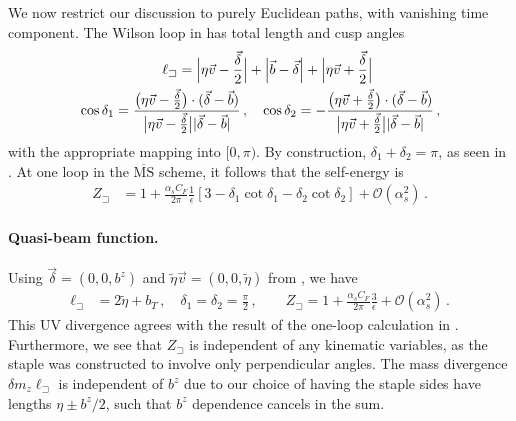 \documentclass[11pt,a4paper]{article}
\newcommand{\MSbar}{{\overline{\mathrm{MS}}}}
\newcommand{\eps}{\epsilon}
\newcommand{\cO}{\mathcal{O}}
\newcommand{\as}{\alpha_s}
\newcommand{\staple}{\sqsupset}
\begin{document}
We now restrict our discussion to purely Euclidean paths, with vanishing time component.
The Wilson loop in  has total length and cusp angles
\begin{align} \label{eq:length}
 &\qquad\qquad\qquad\ell_\staple
 = \Bigl|\eta \vec v - \frac{\vec\delta}{2} \Bigr| + \Bigl| \vec b - \vec \delta \Bigr| + \Bigl|\eta \vec v + \frac{\vec \delta}{2} \Bigr|
\nonumber  \\
& \cos\delta_1
 = \frac{\bigl(\eta \vec v - \tfrac{\vec\delta}{2}\bigr) \cdot (\vec\delta - \vec b)}
        {\bigl|\eta \vec v - \tfrac{\vec\delta}{2}\bigr| |\vec\delta - \vec b|}
\,,\quad
 \cos\delta_2
 = - \frac{\bigl(\eta \vec v + \tfrac{\vec\delta}{2}\bigr) \cdot (\vec\delta - \vec b)}
          {\bigl|\eta \vec v + \tfrac{\vec\delta}{2}\bigr| |\vec\delta - \vec b|}
\,,\end{align}
with the appropriate mapping into $[0,\pi)$.
By construction, $\delta_1 + \delta_2 = \pi$,
as seen in .
At one loop in the $\MSbar$ scheme, it follows that the self-energy is
\begin{align}
 Z_\staple &
 = 1 + \frac{\as C_F}{2\pi} \frac{1}{\eps} \left[ 3 - \delta_1 \cot\delta_1 - \delta_2 \cot\delta_2 \right] + \cO(\as^2)
\,.\end{align}

\paragraph{Quasi-beam function.} Using $\vec\delta = (0,0,b^z)$ and $\tilde\eta \vec v = (0,0,\tilde\eta)$
from , we have
\begin{align}
 \ell_\staple &
 = 2 \tilde\eta + b_T
 \,,\quad
 \delta_1 = \delta_2 = \frac{\pi}{2}
 \,,\qquad
 Z_\staple = 1 + \frac{\as C_F}{2\pi} \frac{3}{\eps} + \cO(\as^2)
\,.\end{align}
This UV divergence agrees with the result of the one-loop calculation in .
Furthermore, we see that $Z_\staple$ is independent of any kinematic
variables, as the staple was constructed to involve only perpendicular angles.
The mass divergence $\delta m_z \ell_\staple$ is independent of $b^z$ due to our choice
of having the staple sides have lengths $\eta \pm b^z/2$, such that $b^z$ dependence cancels in the sum.
\end{document}

